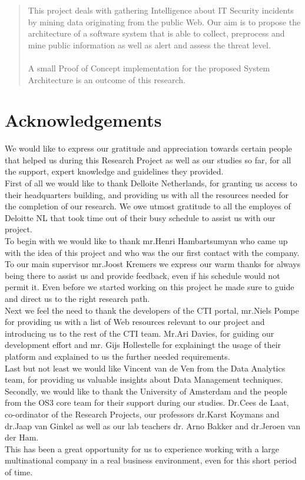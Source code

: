 \documentclass[12pt]{article}
\begin{document}
\newpage
\begin{abstract}
\noindent
This project deals with gathering Intelligence about IT Security incidents by mining data originating from the public Web. Our aim is to propose the architecture of a software system that is able to collect, preprocess and mine public information as well as alert and assess the threat level. \\
\\
A small Proof of Concept implementation for the proposed System Architecture is an outcome of this research. 
\end{abstract}
\newpage
\section*{Acknowledgements}

We would like to express our gratitude and appreciation towards certain people that helped us during this Research Project as well as our studies so far, for all the support, expert knowledge and guidelines they provided. 
\hfill \break \\ 
First of all we would like to thank Delloite Netherlands, for granting us access to their headquarters building, and providing us with all the resources needed for the completion of our research. We owe utmost gratitude to all the employes of Deloitte NL that took time out of their busy schedule to assist us with our project. 
\\ 
To begin with we would like to thank mr.Henri Hambartsumyan who came up with the idea of this project and who was the our first contact with the company. \\
To our main supervisor mr.Joost Kremers we express our warm thanks for always being there to assist us and provide feedback, even if his schedule would not permit it. Even before we started working on this project he made sure to guide and direct us to the right research path.\\
Next we feel the need to thank the developers of the CTI portal, mr.Niels Pompe for providing us with a list of Web resources relevant to our project and introducing us to the rest of the CTI team. Mr.Ari Davies, for guiding our development effort and mr. Gijs Hollestelle for explainingt the usage of their platform and explained to us the further needed requirements.\\
Last but not least we would like Vincent van de Ven from the Data Analytics team, for providing us valuable insights about Data Management techniques. 
\hfill \break \\ 
Secondly, we would like to thank the University of Amsterdam and the people from the OS3 core team for their support during our studies. Dr.Cees de Laat, co-ordinator of the Research Projects, our professors dr.Karst Koymans and dr.Jaap van Ginkel as well as our lab teachers dr. Arno Bakker and dr.Jeroen van der Ham. 
\hfill \break \\ 
This has been a great opportunity for us to experience working with a large multinational company in a real business environment, even for this short period of time.
\end{document}
